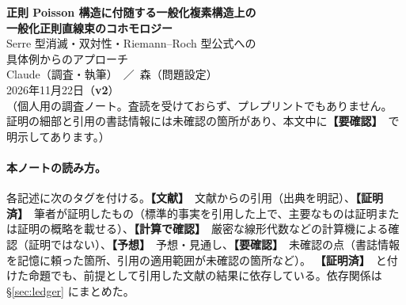 \documentclass[11pt,a4paper]{article}
\newcommand{\tP}{\textcolor{green!45!black}{\textbf{【証明済】}}}
\newcommand{\tC}{\textcolor{blue!55!black}{\textbf{【文献】}}}
\newcommand{\tV}{\textcolor{violet!80!black}{\textbf{【計算で確認】}}}
\newcommand{\tK}{\textcolor{red!70!black}{\textbf{【予想】}}}
\newcommand{\tQ}{\textcolor{orange!85!black}{\textbf{【要確認】}}}
\theoremstyle{definition}
\newcommand{\Jc}{\mathcal J}
\newcommand{\HH}{\mathrm{HH}}
\begin{document}
\sloppy

\begin{center}
{\LARGE\bfseries\sffamily 正則 Poisson 構造に付随する一般化複素構造上の\\[3pt]一般化正則直線束のコホモロジー}\\[8pt]
{\large Serre 型消滅・双対性・Riemann--Roch 型公式への\\具体例からのアプローチ}\\[12pt]
{\large Claude（調査・執筆）\ ／\ 森（問題設定）}\\[3pt]
2026年11月22日（\textbf{v2}）\\[3pt]
{\small （個人用の調査ノート。査読を受けておらず、プレプリントでもありません。\\
証明の細部と引用の書誌情報には未確認の箇所があり、本文中に\tQ\ で明示してあります。）}
\end{center}

\begin{abstract}
\noindent
複素幾何の「三種の神器」（Hirzebruch--Riemann--Roch の定理、Serre の消滅定理、Kodaira の埋め込み定理）の一般化複素幾何版を、最も簡単な非自明な例から攻めるという方針で調べた結果をまとめる。
対象は、正則 Poisson 構造 $\sigma$ から $\beta$-変換で得られる一般化複素構造 $\Jc_\sigma$（$\sigma$ が消える因子 $D$ の上で型が跳ぶ）と、その上の一般化正則直線束 $L$ の一般化 Dolbeault コホモロジー $\HH^*(L)$ である。
主な結果は次の通り。
(1) $\sigma$ が $D$ に沿って対数シンプレクティックのとき、$L$ の一般化正則構造は $D$ に沿った対数的平坦接続と同じものであり、留数 $r_i$ は定数で $c_1(L)=-\sum r_i[D_i]$ となる。
(2) 曲面で $D$ が通常二重点のみをもつ場合、$\HH^k(L)=H^k(X;\mathcal F)\oplus\C^{\mu}[-2]$（$\mathcal F$ は留数で決まる構成可能複体、$\mu$ は二重点の個数）。全 Euler 標数は $\chi(X)$ で $L$ によらず、$L$ への依存は Poincaré 多項式のみに現れる。
(3) 任意次元の射影多様体上の $\beta$-変換構造では、ample な Poisson 加群 $L_0$ について $m\gg0$ のとき横断 Dolbeault 次数 $a>0$ の項が消え、$\HH^k(L_0^m)=0\ (k>n)$ となる（Serre 型定理）。全次数での消滅は $\sigma=0$ でも成り立たない。
(4) 任意のコンパクト複素多様体・任意の正則 Poisson 構造で $\HH^k(L)^*\cong\HH^{2n-k}(L^\vee\otimes K_X^2)$ が成り立つ。
(5) トーリックな場合の weight 公式、4 次元での $\sigma$ の算術への依存、三重点での局所項の計算（一部は予想）。
一般化 Kodaira 埋め込み定理および一般の一般化 Riemann--Roch 公式は得られていない。指数理論的な見通し（b-計算、指標根）は予想の段階である。
\end{abstract}

\paragraph{本ノートの読み方。}
各記述に次のタグを付ける。\tC\ 文献からの引用（出典を明記）、\tP\ 筆者が証明したもの（標準的事実を引用した上で、主要なものは証明または証明の概略を載せる）、\tV\ 厳密な線形代数などの計算機による確認（証明ではない）、\tK\ 予想・見通し、\tQ\ 未確認の点（書誌情報を記憶に頼った箇所、引用の適用範囲が未確認の箇所など）。
\tP\ と付けた命題でも、前提として引用した文献の結果に依存している。依存関係は \S\ref{sec:ledger} にまとめた。

\tableofcontents











\end{document}
